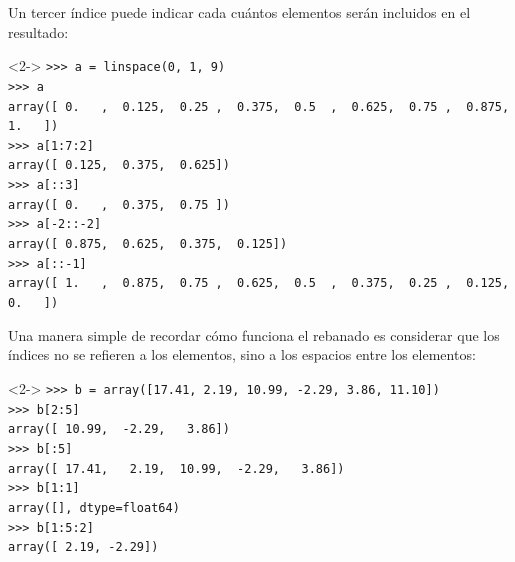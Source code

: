 \begin{frame}[fragile]
Un tercer \'{i}ndice puede indicar cada cu\'{a}ntos elementos ser\'{a}n incluidos en el resultado:
\fontsize{12}{12}\selectfont
\begin{exampleblock}{}<2->
\verb|>>> a = linspace(0, 1, 9)| \\
\pause
\verb|>>> a| \\
\pause
\verb|array([ 0.   ,  0.125,  0.25 ,  0.375,  0.5  ,  0.625,  0.75 ,  0.875,  1.   ])| \\
\pause
\verb|>>> a[1:7:2]| \\
\pause
\verb|array([ 0.125,  0.375,  0.625])| \\
\pause
\verb|>>> a[::3]| \\
\pause
\verb|array([ 0.   ,  0.375,  0.75 ])| \\
\pause
\verb|>>> a[-2::-2]| \\
\pause
\verb|array([ 0.875,  0.625,  0.375,  0.125])| \\
\pause
\verb|>>> a[::-1]| \\
\pause
\verb|array([ 1.   ,  0.875,  0.75 ,  0.625,  0.5  ,  0.375,  0.25 ,  0.125,  0.   ])|
\end{exampleblock}
\end{frame}
\begin{frame}[fragile]
Una manera simple de recordar c\'{o}mo funciona el rebanado es considerar que los \'{i}ndices no se refieren a los elementos, sino a los espacios entre los elementos:
\fontsize{12}{12}\selectfont
\begin{exampleblock}{}<2->
\verb|>>> b = array([17.41, 2.19, 10.99, -2.29, 3.86, 11.10])| \\
\pause
\verb|>>> b[2:5]| \\
\pause
\verb|array([ 10.99,  -2.29,   3.86])| \\
\pause
\verb|>>> b[:5]| \\
\pause
\verb|array([ 17.41,   2.19,  10.99,  -2.29,   3.86])| \\
\pause
\verb|>>> b[1:1]| \\
\pause
\verb|array([], dtype=float64)| \\
\pause
\verb|>>> b[1:5:2]| \\
\pause
\verb|array([ 2.19, -2.29])|
\end{exampleblock}
\end{frame}
